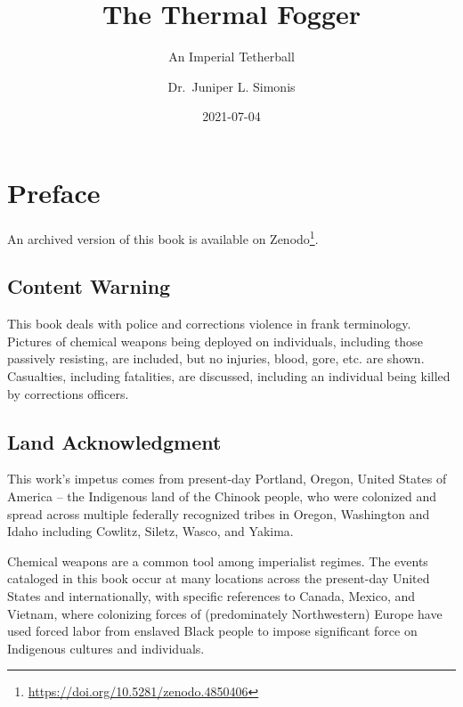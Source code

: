 \documentclass[
  11pt,
  titlepage]{krantz}
\title{The Thermal Fogger}
\subtitle{An Imperial Tetherball}
\author{Dr.~Juniper L. Simonis}
\date{2021-07-04}
\renewcommand{\href}[2]{#2\footnote{\url{#1}}}
\begin{document}
\maketitle



\setlength{\abovedisplayskip}{-5pt}
\setlength{\abovedisplayshortskip}{-5pt}

{
\hypersetup{linkcolor=}
\setcounter{tocdepth}{2}
\tableofcontents
}
\listoffigures
\hypertarget{preface}{%
\chapter*{Preface}\label{preface}}


\href{https://doi.org/10.5281/zenodo.4850406}{An archived version of this book is available on Zenodo}.

\hypertarget{content-warning}{%
\section*{Content Warning}\label{content-warning}}


This book deals with police and corrections violence in frank terminology.
Pictures of chemical weapons being deployed on individuals, including those passively resisting, are included, but no injuries, blood, gore, etc. are shown.
Casualties, including fatalities, are discussed, including an individual being killed by corrections officers.

\hypertarget{land-acknowledgment}{%
\section*{Land Acknowledgment}\label{land-acknowledgment}}


This work's impetus comes from present-day Portland, Oregon, United States of America -- the Indigenous land of the Chinook people, who were colonized and spread across multiple federally recognized tribes in Oregon, Washington and Idaho including Cowlitz, Siletz, Wasco, and Yakima.

Chemical weapons are a common tool among imperialist regimes.
The events cataloged in this book occur at many locations across the present-day United States and internationally, with specific references to Canada, Mexico, and Vietnam, where colonizing forces of (predominately Northwestern) Europe have used forced labor from enslaved Black people to impose significant force on Indigenous cultures and individuals.
\end{document}
